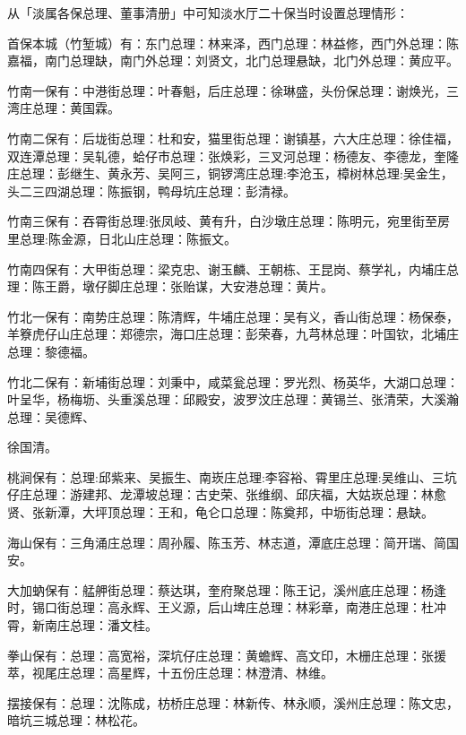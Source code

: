 


从「淡属各保总理、董事清册」中可知淡水厅二十保当时设置总理情形：

首保本城（竹堑城）有：东门总理：林来泽，西门总理：林益修，西门外总理：陈嘉福，南门总理缺，南门外总理：刘贤文，北门总理悬缺，北门外总理：黄应平。

竹南一保有：中港街总理：叶春魁，后庄总理：徐琳盛，头份保总理：谢焕光，三湾庄总理：黄国霖。

竹南二保有：后垅街总理：杜和安，猫里街总理：谢镇基，六大庄总理：徐佳福，双连潭总理：吴轧德，蛤仔市总理：张焕彩，三叉河总理：杨德友、李德龙，奎隆庄总理：彭继生、黄永芳、吴阿三，铜锣湾庄总理:李沧玉，樟树林总理:吴金生，头二三四湖总理：陈振钢，鸭母坑庄总理：彭清禄。

竹南三保有：吞霄街总理:张凤岐、黄有升，白沙墩庄总理：陈明元，宛里街至房里总理:陈金源，日北山庄总理：陈振文。

竹南四保有：大甲街总理：梁克忠、谢玉麟、王朝栋、王昆岗、蔡学礼，内埔庄总理：陈王爵，墩仔脚庄总理：张贻谋，大安港总理：黄片。

竹北一保有：南势庄总理：陈清辉，牛埔庄总理：吴有义，香山街总理：杨保泰，羊簝虎仔山庄总理：郑德宗，海口庄总理：彭荣春，九芎林总理：叶国钦，北埔庄总理：黎德福。

竹北二保有：新埔街总理：刘秉中，咸菜瓮总理：罗光烈、杨英华，大湖口总理：叶呈华，杨梅坜、头重溪总理：邱殿安，波罗汶庄总理：黄锡兰、张清荣，大溪瀚总理：吴德辉、


\noindent 徐国清。

桃涧保有：总理:邱紫来、吴振生、南崁庄总理:李容裕、霄里庄总理:吴维山、三坑仔庄总理：游建邦、龙潭坡总理：古史荣、张维纲、邱庆福，大姑崁总理：林愈贤、张新潭，大坪顶总理：王和，龟仑口总理：陈奠邦，中坜街总理：悬缺。

海山保有：三角涌庄总理：周孙履、陈玉芳、林志道，潭底庄总理：简开瑞、简国安。

大加蚋保有：艋舺街总理：蔡达琪，奎府聚总理：陈王记，溪州底庄总理：杨逢时，锡口街总理：高永辉、王义源，后山埤庄总理：林彩章，南港庄总理：杜冲霄，新南庄总理：潘文桂。

拳山保有：总理：高宽裕，深坑仔庄总理：黄蟾辉、高文印，木栅庄总理：张援萃，视尾庄总理：高星辉，十五份庄总理：林澄清、林维。

摆接保有：总理：沈陈成，枋桥庄总理：林新传、林永顺，溪州庄总理：陈文忠，暗坑三城总理：林松花。

